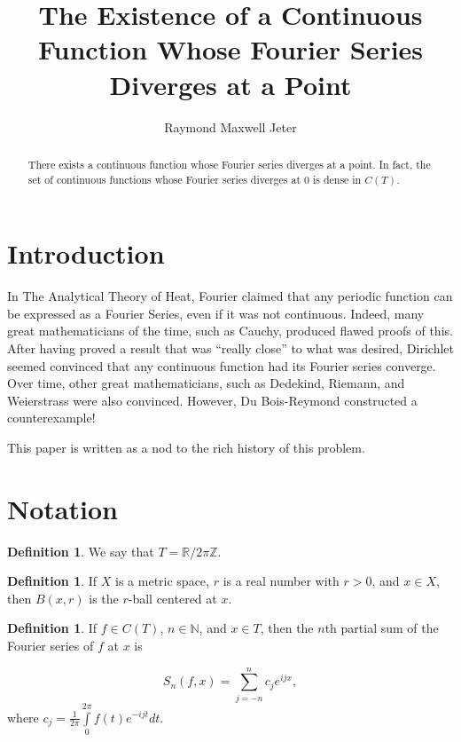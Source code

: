 \documentclass{amsart}
\newcommand{\N}{\mathbb{N}}
\newcommand{\R}{\mathbb{R}}
\newcommand{\Z}{\mathbb{Z}}
\theoremstyle{definition}
\newtheorem{definition}[thm]{Definition}
\begin{document}
\title[A Continuous Function Whose Fourier Series Diverges at a Point]{The Existence of a Continuous Function Whose Fourier Series Diverges at a Point}
\author{Raymond Maxwell Jeter}

\begin{abstract}
There exists a continuous function whose Fourier series diverges at a point. 
In fact, the set of continuous functions whose Fourier series diverges at $0$ is dense in $C(T)$.
\end{abstract}

\maketitle

\section{Introduction}

In The Analytical Theory of Heat, Fourier claimed that any periodic function can be expressed as a Fourier Series, even if it was not continuous. 
Indeed, many great mathematicians of the time, such as Cauchy, produced flawed proofs of this. 
After having proved a result that was ``really close'' to what was desired, Dirichlet seemed convinced that any continuous function had its Fourier series converge.  
Over time, other great mathematicians, such as Dedekind, Riemann, and Weierstrass were also convinced. 
However, Du Bois-Reymond constructed a counterexample! ~\cite{Kor88}

This paper is written as a nod to the rich history of this problem.

\section{Notation}

\begin{definition}
We say that $T = \R / 2\pi \Z$.
\end{definition}

\begin{definition}
If $X$ is a metric space, $r$ is a real number with $r>0$, and $x \in X$, then $B(x,r)$ is the $r$-ball centered at $x$.
\end{definition}

\begin{definition}
If $f \in C(T)$, $n \in \N$, and $x \in T$, then the $n$th partial sum of the Fourier series of $f$ at $x$ is 

\begin{displaymath}
S_n(f,x) = \sum\limits_{j=-n}^n c_j e^{ijx},
\end{displaymath}
where $c_j = \frac{1}{2 \pi} \int\limits_0^{2\pi} f(t)e^{-ijt} dt$.
\end{definition}
\end{document}
